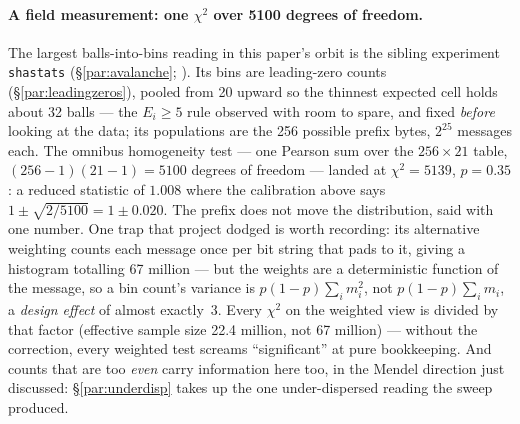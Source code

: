 \documentclass[11pt]{article}
\numberwithin{equation}{section}
\begin{document}
\paragraph{A field measurement: one $\chi^2$ over 5100 degrees of freedom.}
\label{par:homog}
The largest balls-into-bins reading in this paper's orbit is the sibling
experiment \texttt{shastats} (\S\ref{par:avalanche};
\citealp{shastats2026}).  Its bins are leading-zero counts
(\S\ref{par:leadingzeros}), pooled from 20 upward so the thinnest
expected cell holds about 32 balls --- the $E_i\ge5$ rule observed with
room to spare, and fixed \emph{before} looking at the data; its
populations are the 256 possible prefix bytes, $2^{25}$ messages each.
The omnibus homogeneity test --- one Pearson sum over the
$256\times21$ table, $(256-1)(21-1)=5100$ degrees of freedom --- landed
at $\chi^2=5139$, $p=0.35$: a reduced statistic of $1.008$ where the
calibration above says $1\pm\sqrt{2/5100}=1\pm0.020$.  The prefix does
not move the distribution, said with one number.  One trap that project
dodged is worth recording: its alternative weighting counts each message
once per bit string that pads to it, giving a histogram totalling 67
million --- but the weights are a deterministic function of the message,
so a bin count's variance is $p(1-p)\sum_i m_i^2$, not
$p(1-p)\sum_i m_i$, a \emph{design effect} of almost exactly~3.  Every
$\chi^2$ on the weighted view is divided by that factor (effective
sample size 22.4 million, not 67 million) --- without the correction,
every weighted test screams ``significant'' at pure bookkeeping.  And
counts that are too \emph{even} carry information here too, in the
Mendel direction just discussed: \S\ref{par:underdisp} takes up the one
under-dispersed reading the sweep produced.
\end{document}
